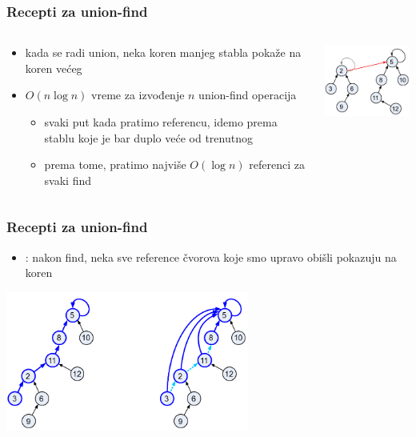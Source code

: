 \documentclass[compress,aspectratio=169]{beamer}
\begin{document}
\begin{frame}[fragile]
  \frametitle{Recepti za union-find}
  \begin{columns}
    \begin{column}[t]{7cm}
      \begin{itemize}
        \item kada se radi union, neka koren manjeg stabla pokaže na
          koren većeg
        \item $O(n\log n)$ vreme za izvođenje $n$ union-find operacija
        \begin{itemize}
          \item svaki put kada pratimo referencu, idemo prema stablu
            koje je bar duplo veće od trenutnog
          \item prema tome, pratimo najviše $O(\log n)$ referenci za
            svaki find
        \end{itemize}
      \end{itemize}
    \end{column}
    \begin{column}[t]{5cm}
      \begin{center}
        \includegraphics[width=4.5cm]{asp-14-pic80.png}
      \end{center}
    \end{column}
  \end{columns}
\end{frame}

\begin{frame}[fragile]
  \frametitle{Recepti za union-find}
  \begin{itemize}
    \item {}: nakon find, neka sve reference
      čvorova koje smo upravo obišli pokazuju na koren
    \end{itemize}
  \begin{center}
    \includegraphics[width=8cm]{asp-14-pic81.png}
  \end{center}
\end{frame}
\end{document}
